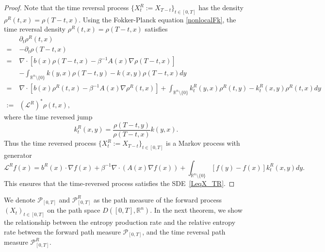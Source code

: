 \documentclass[10pt]{article}
\theoremstyle{definition}
\theoremstyle{remark}
\numberwithin{equation}{section}
\begin{document}
\begin{proof}
Note that the time reversal process $\{ X_t^R := X_{T - t} \}_{t \in [0, T]} $ has the density $\rho^{R}(t,x) = \rho(T-t,x)$. Using the Fokker-Planck equation \eqref{nonlocalFk}, the time reversal density $\rho^{R}(t,x) = \rho(T-t,x)$ satisfies
\begin{align*}
    & \partial_t \rho^{R}(t,x) \\
    = & -\partial_t \rho(T-t,x) \\
    = & \nabla\cdot[ b(x)\rho(T-t,x) - \beta^{-1}A(x)\nabla\rho(T-t,x)] \\
    & - \int_{\mathbb{R}^n\setminus\{0\}} k(y,x)\rho(T-t,y) - k(x,y)\rho(T-t,x) dy \\
    = & \nabla\cdot[ b(x)\rho^R(t,x) - \beta^{-1}A(x)\nabla\rho^R(t,x)] + \int_{\mathbb{R}^n\setminus\{0\}} k^{R}_t(y,x)\rho^R(t,y) - k^{R}_t(x,y)\rho^R(t,x) dy \\
    := & (\mathcal{L}^{R})^{\ast}\rho(t,x),
\end{align*}
where the time reversed jump 
\begin{equation*}
    k^{R}_t(x, y) = \frac{\rho(T-t, y)}{\rho(T-t,x)}k(y,x).
\end{equation*}
Thus the time reversed process $\{ X_t^R := X_{T - t} \}_{t \in [0, T]} $ is a Markov process with generator 
\begin{equation*}
    \mathcal{L}^R f(x) = b^{R}(x) \cdot\nabla f(x) + \beta^{-1} \nabla\cdot (A(x)\nabla f(x)) +   \int_{\mathbb{R}^{n}\setminus \{0\}} [f(y)-f(x)] k^{R}_t(x,y)dy.
\end{equation*}
This ensures that the time-reversed process satisfies the SDE~\eqref{LeqX_TR}.
\end{proof}


{We denote $\mathcal{P}_{[0,T]}$ and $\mathcal{P}^R_{[0,T]}$ as the path measure of the forward process $(X_t)_{t \in [0,T]}$ on the path space $D([0,T], \mathbb{R}^n)$.}
In the next theorem, we show the relationship between the entropy production rate and the relative entropy rate between the forward path measure $\mathcal{P}_{[0,T]}$, and the time reversal path measure $\mathcal{P}^R_{[0,T]}$.
\end{document}
